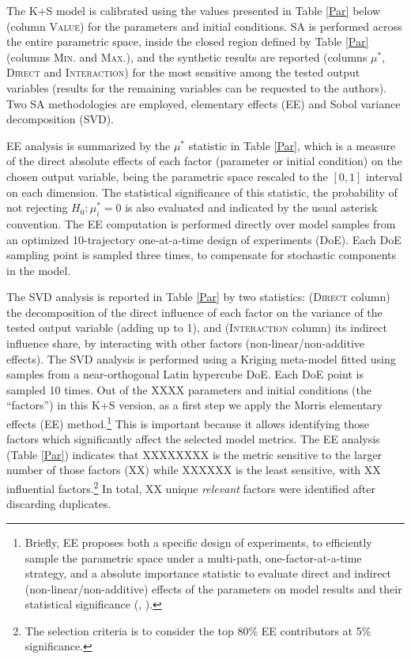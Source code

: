 \documentclass[a4paper,11pt]{article}
\begin{document}
\begin{appendices}
The K+S model is calibrated using the values presented in Table \ref{Par} below (column \textsc{Value}) for the parameters and initial conditions. SA is performed across the entire parametric space, inside the closed region defined by Table \ref{Par} (columns \textsc{Min.} and \textsc{Max.}), and the synthetic results are reported (columns \textsc{$\mu^*$}, \textsc{Direct} and \textsc{Interaction}) for the most sensitive among the tested output variables (results for the remaining variables can be requested to the authors). Two SA methodologies are employed, elementary effects (EE) and Sobol variance decomposition (SVD).

EE analysis is summarized by the $\mu^*$ statistic in Table \ref{Par}, which is a measure of the direct absolute effects of each factor (parameter or initial condition) on the chosen output variable, being the parametric space rescaled to the $[0,1]$ interval on each dimension. The statistical significance of this statistic, the probability of not rejecting $H_0:\mu^*_i = 0$ is also evaluated and indicated by the usual asterisk convention. The EE computation is performed directly over model samples from an optimized 10-trajectory one-at-a-time design of experiments (DoE). Each DoE sampling point is sampled three times, to compensate for stochastic components in the model.

The SVD analysis is reported in Table \ref{Par} by two statistics: (\textsc{Direct} column) the decomposition of the direct influence of each factor on the variance of the tested output variable (adding up to 1), and (\textsc{Interaction} column) its indirect influence share, by interacting with other factors (non-linear/non-additive effects). The SVD analysis is performed using a Kriging meta-model fitted using samples from a near-orthogonal Latin hypercube DoE. Each DoE point is sampled 10 times. Out of the XXXX parameters and initial conditions (the ``factors'') in this K+S version, as a first step we apply the Morris elementary effects (EE) method.\footnote{Briefly, EE proposes both a specific design of experiments, to efficiently sample the parametric space under a multi-path, one-factor-at-a-time strategy, and a absolute importance statistic to evaluate direct and indirect (non-linear/non-additive) effects of the parameters on model results and their statistical significance (\citealp{morris1991factorial}, \citealp{saltelli2008global}).} This is important because it allows identifying those factors which significantly affect the selected model metrics. The EE analysis (Table \ref{Par}) indicates that XXXXXXXX is the metric sensitive to the larger number of those factors (XX) while XXXXXX is the least sensitive, with XX influential factors.\footnote{The selection criteria is to consider the top 80\% EE contributors at 5\% significance.} In total, XX unique \emph{relevant} factors were identified after discarding duplicates.


\end{appendices}
\end{document}
